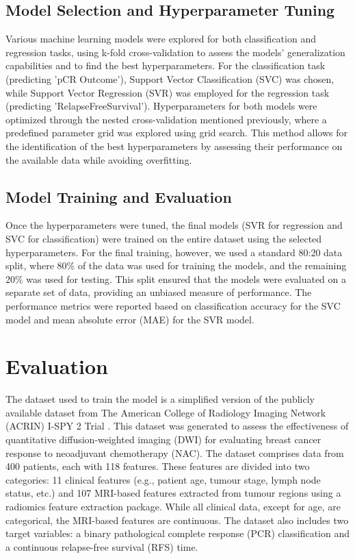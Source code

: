 \documentclass{article}
\begin{document}
\subsection{Model Selection and Hyperparameter Tuning}

Various machine learning models were explored for both classification and regression tasks, using k-fold cross-validation to assess the models' generalization capabilities and to find the best hyperparameters. For the classification task (predicting 'pCR Outcome'), Support Vector Classification (SVC) was chosen, while Support Vector Regression (SVR) was employed for the regression task (predicting 'RelapseFreeSurvival'). Hyperparameters for both models were optimized through the nested cross-validation mentioned previously, where a predefined parameter grid was explored using grid search. This method allows for the identification of the best hyperparameters by assessing their performance on the available data while avoiding overfitting.

\subsection{Model Training and Evaluation}

Once the hyperparameters were tuned, the final models (SVR for regression and SVC for classification) were trained on the entire dataset using the selected hyperparameters. For the final training, however, we used a standard 80:20 data split, where 80\% of the data was used for training the models, and the remaining 20\% was used for testing. This split ensured that the models were evaluated on a separate set of data, providing an unbiased measure of performance. The performance metrics were reported based on classification accuracy for the SVC model and mean absolute error (MAE) for the SVR model.

\section{Evaluation}

The dataset used to train the model is a simplified version of the publicly available dataset from The American College of Radiology Imaging Network (ACRIN) I-SPY 2 Trial \cite{newitt2021acr}. This dataset was generated to assess the effectiveness of quantitative diffusion-weighted imaging (DWI) for evaluating breast cancer response to neoadjuvant chemotherapy (NAC). The dataset comprises data from 400 patients, each with 118 features. These features are divided into two categories: 11 clinical features (e.g., patient age, tumour stage, lymph node status, etc.) and 107 MRI-based features extracted from tumour regions using a radiomics feature extraction package. While all clinical data, except for age, are categorical, the MRI-based features are continuous. The dataset also includes two target variables: a binary pathological complete response (PCR) classification and a continuous relapse-free survival (RFS) time.
\end{document}
